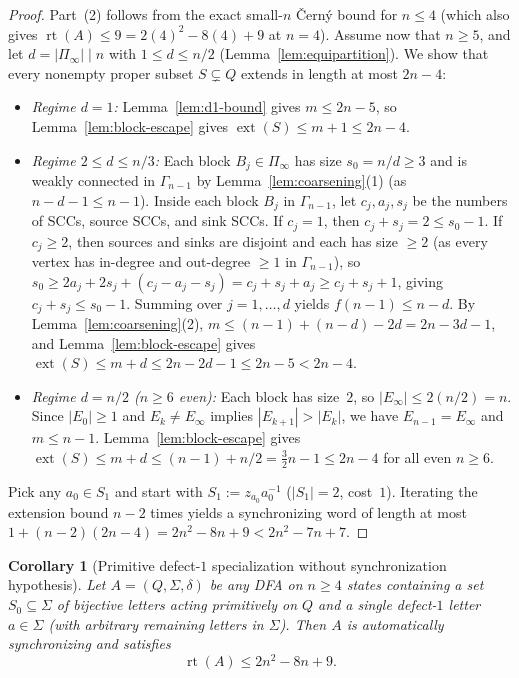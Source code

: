 \documentclass[11pt,a4paper]{article}
\newtheorem{corollary}[theorem]{Corollary}
\theoremstyle{definition}
\theoremstyle{remark}
\newcommand{\rt}{\operatorname{rt}}
\newcommand{\ext}{\operatorname{ext}}
\begin{document}
\begin{proof}
Part~(2) follows from the exact small-$n$ \v{C}ern\'y bound for $n \le 4$ (which also gives $\rt(A) \le 9 = 2(4)^2 - 8(4) + 9$ at $n = 4$). Assume now that $n \ge 5$, and let $d = |\Pi_\infty| \mid n$ with $1 \le d \le n / 2$ (Lemma~\ref{lem:equipartition}). We show that every nonempty proper subset $S \subsetneq Q$ extends in length at most $2n - 4$:
\begin{itemize}[leftmargin=*,nosep]
  \item \emph{Regime $d = 1$:} Lemma~\ref{lem:d1-bound} gives $m \le 2n - 5$, so Lemma~\ref{lem:block-escape} gives $\ext(S) \le m + 1 \le 2n - 4$.
  \item \emph{Regime $2 \le d \le n / 3$:} Each block $B_j \in \Pi_\infty$ has size $s_0 = n / d \ge 3$ and is weakly connected in $\Gamma_{n - 1}$ by Lemma~\ref{lem:coarsening}(1) (as $n - d - 1 \le n - 1$). Inside each block $B_j$ in $\Gamma_{n - 1}$, let $c_j, a_j, s_j$ be the numbers of SCCs, source SCCs, and sink SCCs. If $c_j = 1$, then $c_j + s_j = 2 \le s_0 - 1$. If $c_j \ge 2$, then sources and sinks are disjoint and each has size $\ge 2$ (as every vertex has in-degree and out-degree $\ge 1$ in $\Gamma_{n - 1}$), so $s_0 \ge 2a_j + 2s_j + (c_j - a_j - s_j) = c_j + s_j + a_j \ge c_j + s_j + 1$, giving $c_j + s_j \le s_0 - 1$. Summing over $j = 1, \dots, d$ yields $f(n - 1) \le n - d$. By Lemma~\ref{lem:coarsening}(2), $m \le (n - 1) + (n - d) - 2d = 2n - 3d - 1$, and Lemma~\ref{lem:block-escape} gives $\ext(S) \le m + d \le 2n - 2d - 1 \le 2n - 5 < 2n - 4$.
  \item \emph{Regime $d = n / 2$ ($n \ge 6$ even):} Each block has size~$2$, so $|E_\infty| \le 2(n / 2) = n$. Since $|E_0| \ge 1$ and $E_k \neq E_\infty$ implies $|E_{k+1}| > |E_k|$, we have $E_{n - 1} = E_\infty$ and $m \le n - 1$. Lemma~\ref{lem:block-escape} gives $\ext(S) \le m + d \le (n - 1) + n / 2 = \frac{3}{2}n - 1 \le 2n - 4$ for all even $n \ge 6$.
\end{itemize}
Pick any $a_0 \in S_1$ and start with $S_1 := z_{a_0} a_0^{-1}$ ($|S_1| = 2$, cost~$1$). Iterating the extension bound $n - 2$ times yields a synchronizing word of length at most $1 + (n - 2)(2n - 4) = 2n^2 - 8n + 9 < 2n^2 - 7n + 7$.
\end{proof}

\begin{corollary}[Primitive defect-$1$ specialization without synchronization hypothesis]\label{cor:primitive-beats-zhu}
Let $A = (Q, \Sigma, \delta)$ be any DFA on $n \ge 4$ states containing a set $S_0 \subseteq \Sigma$ of bijective letters acting primitively on $Q$ and a single defect-$1$ letter $a \in \Sigma$ (with arbitrary remaining letters in $\Sigma$). Then $A$ is automatically synchronizing and satisfies
\[
  \rt(A) \le 2n^2 - 8n + 9.
\]
\end{corollary}
\end{document}
